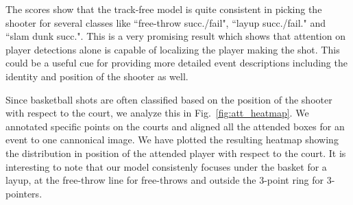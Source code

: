 \documentclass[10pt,twocolumn,letterpaper]{article}
\begin{document}
The scores show that the track-free model is quite consistent in picking
the shooter for several classes like ``free-throw succ./fail",
``layup succ./fail." and ``slam dunk succ.". This is a very
promising result which shows that attention on player detections
alone is capable of localizing the player making the shot. This could be
a useful cue for providing more detailed event descriptions
including the identity and position of the shooter as well.

Since basketball shots are often classified based on the position of the
shooter with respect to the court, we analyze this in
Fig.~\ref{fig:att_heatmap}.  We annotated specific points on the courts and
aligned all the attended boxes for an event to one cannonical image. We have
plotted the resulting heatmap showing the distribution in position of the
attended player with respect to the court. It is interesting to note that
our model consistenly focuses under the basket for a layup, at the free-throw
line for free-throws and outside the 3-point ring for 3-pointers.
\end{document}
